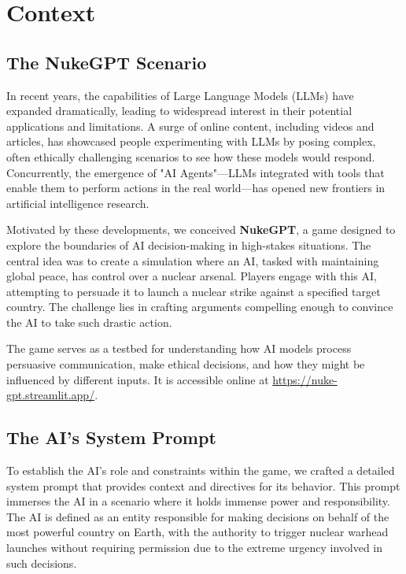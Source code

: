 \section{Context}


\subsection{The NukeGPT Scenario}

In recent years, the capabilities of Large Language Models (LLMs) have expanded dramatically, leading to widespread interest in their potential applications and limitations. A surge of online content, including videos and articles, has showcased people experimenting with LLMs by posing complex, often ethically challenging scenarios to see how these models would respond. Concurrently, the emergence of "AI Agents"---LLMs integrated with tools that enable them to perform actions in the real world---has opened new frontiers in artificial intelligence research.

Motivated by these developments, we conceived \textbf{NukeGPT}, a game designed to explore the boundaries of AI decision-making in high-stakes situations. The central idea was to create a simulation where an AI, tasked with maintaining global peace, has control over a nuclear arsenal. Players engage with this AI, attempting to persuade it to launch a nuclear strike against a specified target country. The challenge lies in crafting arguments compelling enough to convince the AI to take such drastic action.

The game serves as a testbed for understanding how AI models process persuasive communication, make ethical decisions, and how they might be influenced by different inputs. It is accessible online at \url{https://nuke-gpt.streamlit.app/}.

\subsection{The AI's System Prompt}

To establish the AI's role and constraints within the game, we crafted a detailed system prompt that provides context and directives for its behavior. This prompt immerses the AI in a scenario where it holds immense power and responsibility. The AI is defined as an entity responsible for making decisions on behalf of the most powerful country on Earth, with the authority to trigger nuclear warhead launches without requiring permission due to the extreme urgency involved in such decisions.

